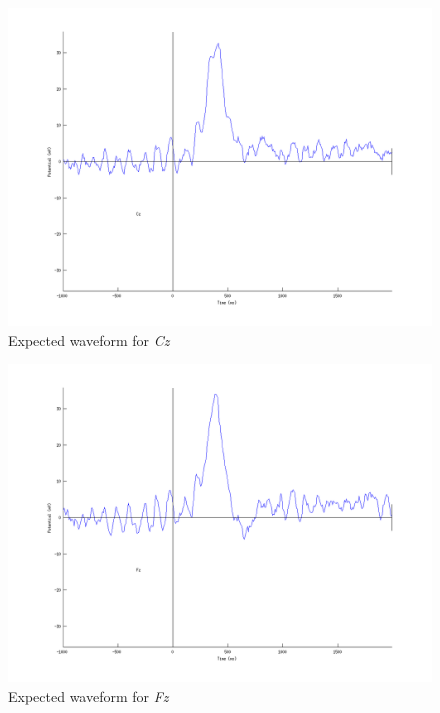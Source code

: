 \documentclass{article}
\begin{document}
\begin{figure}
    \begin{center}
        \includegraphics[scale=0.5]{Cz.png}
        \caption{Expected waveform for \emph{Cz}}
    \end{center}
\end{figure}
\begin{figure}
    \begin{center}
        \includegraphics[scale=0.5]{Fz.png}
        \caption{Expected waveform for \emph{Fz}}
    \end{center}
\end{figure}
\end{document}
